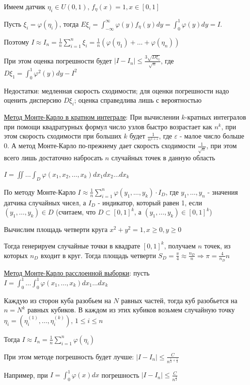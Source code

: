 \begin{enumerate}
    Имеем датчик $\eta_i \in U(0, 1)$, $f_{\eta} (x) = 1, x \in [0, 1]$

    Пусть $\xi_i = \varphi(\eta_i)$, тогда $E\xi_i = \int_{-\infty}^{\infty} \varphi(y) f_\eta (y) dy = \int_0^1 \varphi(y) dy = I$. 
    
    Поэтому $I \approx I_n = \frac{1}{n} \sum_{i = 1}^n \xi_i = \frac{1}{n} (\varphi(\eta_1) + \dots + \varphi(\eta_n))$

    При этом оценка погрешности будет $|I - I_n| \leq \frac{3\sqrt{D \xi_1}}{\sqrt{n}}$, где $D \xi_1 = \int_0^1 \varphi^2(y) dy - I^2$

    Недостатки: медленная скорость сходимости; для оценки погрешности надо оценить дисперсию $D\xi_i$; оценка справедлива лишь с вероятностью

    
    \hyperlink{monte_carlo_k_integral}{Метод Монте-Карло в кратном интеграле}: При вычислении $k$-кратных интегралов при помощи квадратурных формул число узлов быстро возрастает как $n^k$, при этом скорость сходимости при больших $k$ будет $\frac{1}{n^{1 + \varepsilon}}$, где $\varepsilon$ - малое число больше 0. А метод Монте-Карло по-прежнему дает скорость сходимости $\frac{1}{\sqrt{n}}$, при этом всего лишь достаточно набросать $n$ случайных точек в данную область

    $I = \iint \dots \int_D \varphi(x_1, x_2, \dots, x_k) dx_1 dx_2 \dots dx_k$

    По методу Монте-Карло $I \approx \frac{1}{n} \sum_{i = 1}^n \varphi(y_1, \dots, y_k) \cdot I_D$, где $y_1, \dots, y_n$ - значения датчика случайных чисел, а $I_D$ - индикатор, который равен 1, если $(y_1, \dots, y_k) \in D$ (считаем, что $D \subset [0, 1]^k$, а $(y_1, \dots, y_k) \in [0, 1]^k$) 

    \Ex Вычислим площадь четверти круга $x^2 + y^2 = 1, x \geq 0, y \geq 0$

    Тогда генерируем случайные точки в квадрате $[0, 1]^k$, получаем $n$ точек, из которых $n_D$ входит в круг. Тогда площадь четверти $S_D = \frac{\pi}{4} \approx \frac{n_D}{n} \Longrightarrow \pi = \frac{4}{n_D}{n}$

    
    \hyperlink{monte_carlo_2}{Метод Монте-Карло расслоенной выборки}: пусть $I = \int_0^1 \dots \int_0^1 \varphi(x_1, \dots, x_k) dx_1 \dots dx_k$

    Каждую из сторон куба разобьем на $N$ равных частей, тогда куб разобьется на $n = N^k$ равных кубиков. В каждом из этих кубиков возьмем случайную точку $\eta_i = (\eta_i^{(1)}, \dots, \eta_i^{(k)})$, $1 \leq i \leq n$

    Тогда $I \approx I_n = \frac{1}{n} \sum_{i = 1}^n \varphi(\eta_i)$

    При этом методе погрешность будет лучше: $|I - I_n| \leq \frac{C}{n^{\frac{1}{2} + \frac{1}{k}}}$

    Например, при $I = \int_0^1 \varphi(x) dx$ погрешность $|I - I_n| \leq \frac{C}{n^\frac{3}{2}}$


\end{enumerate}
